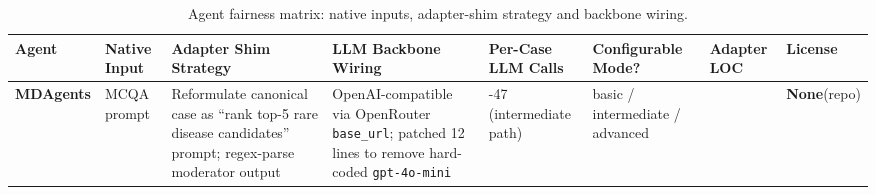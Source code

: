 \begin{table}[t]
\centering\scriptsize\setlength{\tabcolsep}{3.5pt}
\caption{Agent fairness matrix: native inputs, adapter-shim strategy and backbone wiring.}\label{tbl:fairness}
\begin{tabular}{@{}
>{\raggedright\arraybackslash}p{}
  >{\raggedright\arraybackslash}p{}
  >{\raggedright\arraybackslash}p{}
  >{\raggedright\arraybackslash}p{}
  >{\raggedright\arraybackslash}p{}
  >{\raggedright\arraybackslash}p{}
  >{\raggedright\arraybackslash}p{}
  >{\raggedright\arraybackslash}p{}@{}}
\toprule
\begin{minipage}[b]{\linewidth}\raggedright
Agent
\end{minipage} & \begin{minipage}[b]{\linewidth}\raggedright
Native Input
\end{minipage} & \begin{minipage}[b]{\linewidth}\raggedright
Adapter Shim Strategy
\end{minipage} & \begin{minipage}[b]{\linewidth}\raggedright
LLM Backbone Wiring
\end{minipage} & \begin{minipage}[b]{\linewidth}\raggedright
Per-Case LLM Calls
\end{minipage} & \begin{minipage}[b]{\linewidth}\raggedright
Configurable Mode?
\end{minipage} & \begin{minipage}[b]{\linewidth}\raggedright
Adapter LOC
\end{minipage} & \begin{minipage}[b]{\linewidth}\raggedright
License
\end{minipage} \\
\midrule
\textbf{MDAgents} & MCQA prompt & Reformulate canonical case as ``rank top-5 rare disease candidates'' prompt; regex-parse moderator output & OpenAI-compatible via OpenRouter \texttt{base\_url}; patched 12 lines to remove hard-coded \texttt{gpt-4o-mini} & 7-47 (intermediate path) & basic / intermediate / advanced & 301 & \textbf{None}(repo) \\

\end{tabular}
\end{table}
